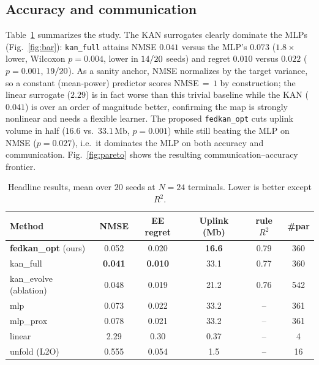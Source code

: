 \documentclass[journal]{IEEEtran}
\newcommand{\FOnmse}{0.052}\newcommand{\FOnmsesd}{0.013}
\newcommand{\FOreg}{0.020}\newcommand{\FObits}{16.6}
\newcommand{\FOrtwo}{0.79}\newcommand{\FOpar}{360}
\newcommand{\KFnmse}{0.041}\newcommand{\KFnmsesd}{0.012}
\newcommand{\KFreg}{0.010}\newcommand{\KFbits}{33.1}
\newcommand{\KFrtwo}{0.77}\newcommand{\KFpar}{360}
\newcommand{\KEnmse}{0.048}\newcommand{\KEreg}{0.019}
\newcommand{\KEbits}{21.2}\newcommand{\KErtwo}{0.76}\newcommand{\KEpar}{542}
\newcommand{\MLnmse}{0.073}\newcommand{\MLnmsesd}{0.040}
\newcommand{\MLreg}{0.022}\newcommand{\MLbits}{33.2}\newcommand{\MLpar}{361}
\newcommand{\MPnmse}{0.078}\newcommand{\MPnmsesd}{0.035}
\newcommand{\MPreg}{0.021}\newcommand{\MPbits}{33.2}\newcommand{\MPpar}{361}
\newcommand{\LInmse}{2.29}\newcommand{\LIreg}{0.30}
\newcommand{\LIbits}{0.37}\newcommand{\LIpar}{4}
\newcommand{\UNnmse}{0.555}\newcommand{\UNreg}{0.054}
\newcommand{\UNbits}{1.5}\newcommand{\UNpar}{16}
\newcommand{\ratioNmse}{1.8}\newcommand{\ratioReg}{2.2}
\newcommand{\pNmse}{0.004}\newcommand{\pReg}{0.001}
\newcommand{\pBits}{0.001}\newcommand{\pFOmlp}{0.027}
\newcommand{\Nnodes}{24}\newcommand{\Nseeds}{20}
\begin{document}
\subsection{Accuracy and communication}
Table~\ref{tab:main} summarizes the study. The KAN surrogates clearly dominate the
MLPs (Fig.~\ref{fig:bar}): \texttt{kan\_full} attains NMSE $\KFnmse$ versus the
MLP's $\MLnmse$ ($\ratioNmse\times$ lower, Wilcoxon $p=\pNmse$, lower in $14/20$
seeds) and regret $\KFreg$ versus $\MLreg$ ($p=\pReg$, $19/20$). As a sanity anchor, NMSE
normalizes by the target variance, so a constant (mean-power) predictor scores
NMSE$\,=\,1$ by construction; the linear surrogate ($\LInmse$) is in fact worse than
this trivial baseline while the KAN ($\KFnmse$) is over an order of magnitude
better, confirming the map is strongly nonlinear and needs a flexible learner. The proposed \texttt{fedkan\_opt}
cuts uplink volume in half ($\FObits$ vs.\ $\KFbits$\,Mb, $p=\pBits$) while still
beating the MLP on NMSE ($p=\pFOmlp$), i.e.\ it dominates the MLP on both accuracy
and communication. Fig.~\ref{fig:pareto} shows the resulting communication--accuracy
frontier.

\begin{table}[t]
\caption{Headline results, mean over $\Nseeds$ seeds at $N=\Nnodes$ terminals.
Lower is better except $R^2$.}
\label{tab:main}
\centering
\footnotesize\setlength{\tabcolsep}{3.5pt}
\begin{tabular}{lccccc}
\toprule
Method & NMSE & EE regret & Uplink (Mb) & rule $R^2$ & \#par \\
\midrule
\textbf{fedkan\_opt} (ours) & \FOnmse & \FOreg & \textbf{\FObits} & \FOrtwo & \FOpar \\
kan\_full              & \textbf{\KFnmse} & \textbf{\KFreg} & \KFbits & \KFrtwo & \KFpar \\
kan\_evolve (ablation) & \KEnmse & \KEreg & \KEbits & \KErtwo & \KEpar \\
mlp                    & \MLnmse & \MLreg & \MLbits & --   & \MLpar \\
mlp\_prox              & \MPnmse & \MPreg & \MPbits & --   & \MPpar \\
linear                 & \LInmse & \LIreg & \LIbits & --   & \LIpar \\
unfold (L2O)           & \UNnmse & \UNreg & \UNbits & --   & \UNpar \\
\bottomrule
\end{tabular}
\end{table}
\end{document}
